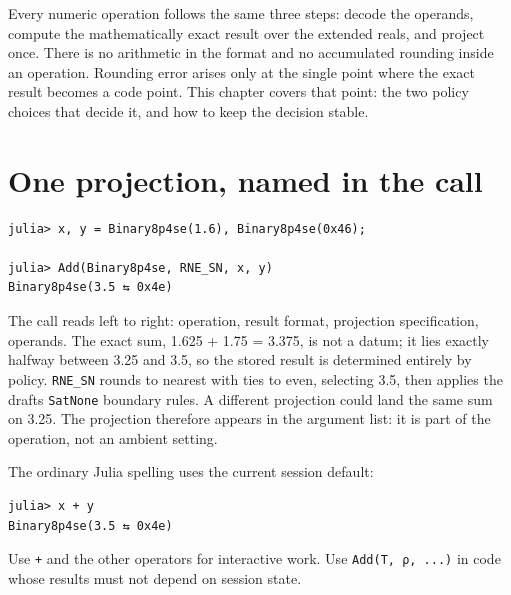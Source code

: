 \label{6001489924641501409}{}


Every numeric operation follows the same three steps: decode the operands, compute the mathematically exact result over the extended reals, and project once. There is no arithmetic {\textquotedbl}in the format{\textquotedbl} and no accumulated rounding inside an operation. Rounding error arises only at the single point where the exact result becomes a code point. This chapter covers that point: the two policy choices that decide it, and how to keep the decision stable.



\section{One projection, named in the call}



\label{13836310120754226451}{}



\begin{verbatim}
julia> x, y = Binary8p4se(1.6), Binary8p4se(0x46);

julia> Add(Binary8p4se, RNE_SN, x, y)
Binary8p4se(3.5 ⇆ 0x4e)
\end{verbatim}



The call reads left to right: operation, result format, projection specification, operands. The exact sum, 1.625 + 1.75 = 3.375, is not a datum; it lies exactly halfway between 3.25 and 3.5, so the stored result is determined entirely by policy. \texttt{RNE\_\allowbreak{}SN} rounds to nearest with ties to even, selecting 3.5, then applies the draft{\textquotesingle}s \texttt{SatNone} boundary rules. A different projection could land the same sum on 3.25. The projection therefore appears in the argument list: it is part of the operation, not an ambient setting.



The ordinary Julia spelling uses the current session default:




\nopagebreak[4]
\begin{verbatim}
julia> x + y
Binary8p4se(3.5 ⇆ 0x4e)
\end{verbatim}



Use \texttt{+} and the other operators for interactive work. Use \texttt{Add(T, ρ, ...)} in code whose results must not depend on session state.



